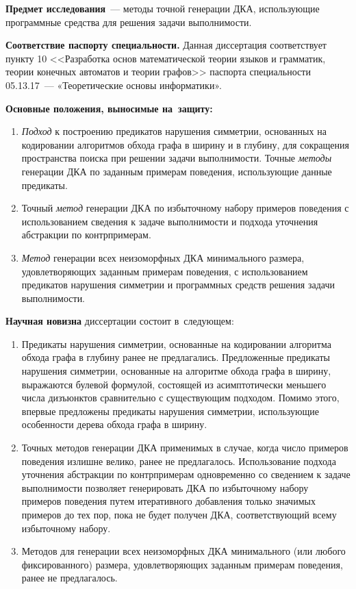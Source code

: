 \textbf{Предмет исследования}~{---} методы точной генерации ДКА, использующие программные средства для решения задачи выполнимости.

\textbf{Соответствие паспорту специальности.} Данная диссертация соответствует пункту 10 <<Разработка основ математической теории языков и грамматик, теории конечных автоматов и теории графов>> паспорта специальности 05.13.17~--- «Теоретические основы информатики».

\textbf{Основные положения, выносимые на~защиту:}
\begin{enumerate}
  \item \emph{Подход} к построению предикатов нарушения симметрии, основанных на кодировании алгоритмов обхода графа в ширину и в глубину, для сокращения пространства поиска при решении задачи выполнимости.
  Точные \emph{методы} генерации ДКА по заданным примерам поведения, использующие данные предикаты.
  
  \item Точный \emph{метод} генерации ДКА по избыточному набору примеров поведения с использованием сведения к задаче выполнимости и подхода уточнения абстракции по контрпримерам.

  \item \emph{Метод} генерации всех неизоморфных ДКА минимального размера, удовлетворяющих заданным примерам поведения, с использованием предикатов нарушения симметрии и программных средств решения задачи выполнимости.
\end{enumerate}

\textbf{Научная новизна} диссертации состоит в~следующем:
\begin{enumerate}
  \item Предикаты нарушения симметрии, основанные на кодировании алгоритма обхода графа в глубину ранее не предлагались.
  Предложенные предикаты нарушения симметрии, основанные на алгоритме обхода графа в ширину, выражаются булевой формулой, состоящей из асимптотически меньшего числа дизъюнктов сравнительно с существующим подходом.
  Помимо этого, впервые предложены предикаты нарушения симметрии, использующие особенности дерева обхода графа в ширину.

  \item Точных методов генерации ДКА применимых в случае, когда число примеров поведения излишне велико, ранее не предлагалось.
  Использование подхода уточнения абстракции по контрпримерам одновременно со сведением к задаче выполнимости позволяет генерировать ДКА по избыточному набору примеров поведения путем итеративного добавления только значимых примеров до тех пор, пока не будет получен ДКА, соответствующий всему избыточному набору.

  \item Методов для генерации всех неизоморфных ДКА минимального (или любого фиксированного) размера, удовлетворяющих заданным примерам поведения, ранее не предлагалось.

\end{enumerate}

